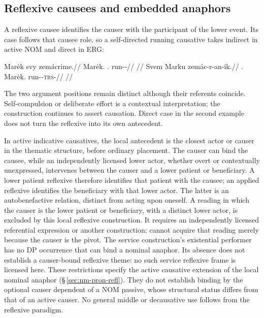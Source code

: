 \subsection{Reflexive causees and embedded anaphors}
\label{sec:causative-reflexives}\label{sec:valency-reflexives}

A reflexive causee identifies the causer with the participant of the lower
event. Its case follows that causee role, so a self-directed running
causative takes indirect  in active NOM and direct 
in ERG:

\pex\label{ex:val-reflexive-causee}
\a
\begingl
\gla Marėk svy zemácrime.//
\glb Marėk.\Dir{} \Refl{}.\Ind{} run-\Caus{}-\Prog{}//
\glft {}//
\endgl
\a
\begingl
\gla Svem Marku zemác-r-an-ik.//
\glb \Refl{}.\Dir{} Marėk.\Trs{} run-\Caus{}-\textsc{trs}-\Pf{}//
\glft {}//
\endgl
\xe

The two argument positions remain distinct although their referents coincide.
Self-compulsion or deliberate effort is a contextual interpretation; the
construction continues to assert causation. Direct case in the second
example does not turn the reflexive into its own antecedent.

In active indicative causatives, the local antecedent is the closest actor
or causer in the thematic structure, before ordinary placement. The causer can bind
the causee, while an independently licensed lower actor, whether overt or
contextually unexpressed, intervenes between the causer and a lower patient
or beneficiary. A lower patient reflexive
therefore identifies that patient with the causee; an applied reflexive
identifies the beneficiary with that lower actor. The latter is an
autobenefactive relation, distinct from acting upon oneself. A reading in
which the causer is the lower patient or beneficiary, with a distinct lower
actor, is excluded by this local reflexive construction. It requires an
independently licensed referential expression or another construction;
 cannot acquire that reading merely because the causer is the pivot.
The service construction's existential performer has no DP occurrence
that can bind a nominal anaphor. Its absence does not establish a
causer-bound reflexive theme: no such service reflexive frame is licensed
here.
These restrictions specify the active causative extension of the local
nominal anaphor (§\,\ref{sec:nm-pron-refl}). They do not establish
binding by the optional causer dependent of a NOM passive, whose structural
status differs from that of an active causer. No general middle or
decausative use follows from the reflexive paradigm.

